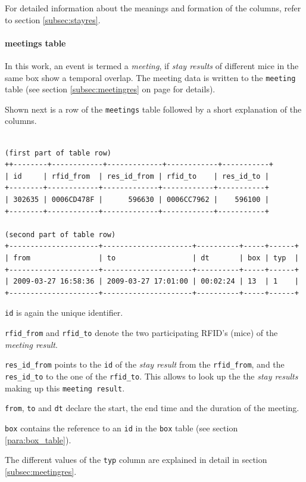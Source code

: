 For detailed information about the meanings and formation of the columns, refer to section \ref{subsec:stayres}.

\paragraph{meetings table}
\label{para:meetings_table}

In this work, an event is termed a \textit{meeting}, if \textit{stay results} of different mice in the same box show a temporal overlap. The meeting data is written to the \lstinline|meeting| table (see section \ref{subsec:meetingres} on page \pageref{subsec:meetingres} for details).

Shown next is a row of the \lstinline|meetings| table followed by a short explanation of the columns.
\codescript
\begin{lstlisting}[frame=none]

(first part of table row)
++--------+------------+-------------+------------+-----------+
| id     | rfid_from  | res_id_from | rfid_to    | res_id_to |
+--------+------------+-------------+------------+-----------+
| 302635 | 0006CD478F |      596630 | 0006CC7962 |    596100 | 
+--------+------------+-------------+------------+-----------+

(second part of table row)
+---------------------+---------------------+----------+-----+------+
| from                | to                  | dt       | box | typ  |
+---------------------+---------------------+----------+-----+------+
| 2009-03-27 16:58:36 | 2009-03-27 17:01:00 | 00:02:24 | 13  | 1    |
+---------------------+---------------------+----------+-----+------+
\end{lstlisting}

\begin{mydesc}
	\item \lstinline|id| is again the unique identifier.
	\item \lstinline|rfid_from| and \lstinline|rfid_to| denote the two participating RFID's (mice) of the \textit{meeting result}.
	\item \lstinline|res_id_from| points to the \lstinline|id| of the \textit{stay result} from the \lstinline|rfid_from|, and the \lstinline|res_id_to| to the one of the \lstinline|rfid_to|. This allows to look up the the \textit{stay results} making up this \lstinline|meeting result|.
	\item \lstinline|from|, \lstinline|to| and \lstinline|dt| declare the start, the end time and the duration of the meeting.
	\item \lstinline|box| contains the reference to an \lstinline|id| in the \lstinline|box| table (see section \ref{para:box_table}).
	\item The different values of the \lstinline|typ| column are explained in detail in section \ref{subsec:meetingres}.
\end{mydesc}

